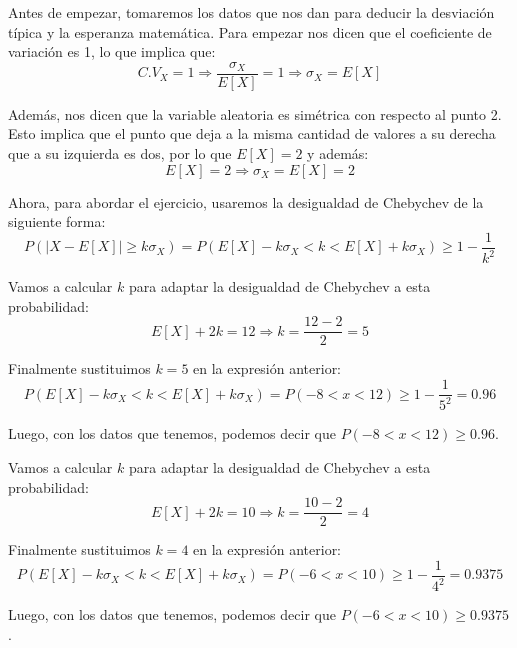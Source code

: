 \problem

Antes de empezar, tomaremos los datos que nos dan para deducir la desviación típica y la esperanza matemática. Para empezar nos dicen que el coeficiente de variación es 1, lo que implica que:
\begin{equation*}
    C.V_X = 1 \Rightarrow \dfrac{\sigma_X}{E[X]} = 1 \Rightarrow \sigma_X = E[X]
\end{equation*}

Además, nos dicen que la variable aleatoria es simétrica con respecto al punto 2. Esto implica que el punto que deja a la misma cantidad de valores a su derecha que a su izquierda es dos, por lo que $E[X] = 2$ y además:
\begin{equation*}
    E[X] = 2 \Rightarrow \sigma_X = E[X] = 2
\end{equation*}

Ahora, para abordar el ejercicio, usaremos la desigualdad de Chebychev de la siguiente forma:
\begin{equation*}
    P(|X-E[X]| \geq k \sigma_X) = P(E[X] - k\sigma_X < k < E[X] + k\sigma_X) \geq 1 - \dfrac{1}{k^2}
\end{equation*}

\subproblem

Vamos a calcular $k$ para adaptar la desigualdad de Chebychev a esta probabilidad:
\begin{equation*}
    E[X] + 2k = 12 \Rightarrow k = \dfrac{12-2}{2} = 5
\end{equation*}

Finalmente sustituimos $k=5$ en la expresión anterior:
\begin{equation*}
    P(E[X] - k\sigma_X < k < E[X] + k\sigma_X) = P(-8 < x < 12) \geq 1 - \dfrac{1}{5^2} = 0.96
\end{equation*}

Luego, con los datos que tenemos, podemos decir que $P(-8 < x < 12) \geq 0.96$.

\subproblem

Vamos a calcular $k$ para adaptar la desigualdad de Chebychev a esta probabilidad:
\begin{equation*}
    E[X] + 2k = 10 \Rightarrow k = \dfrac{10-2}{2} = 4
\end{equation*}

Finalmente sustituimos $k=4$ en la expresión anterior:
\begin{equation*}
    P(E[X] - k\sigma_X < k < E[X] + k\sigma_X) = P(-6 < x < 10) \geq 1 - \dfrac{1}{4^2} = 0.9375
\end{equation*}

Luego, con los datos que tenemos, podemos decir que $P(-6 < x < 10) \geq 0.9375$.
